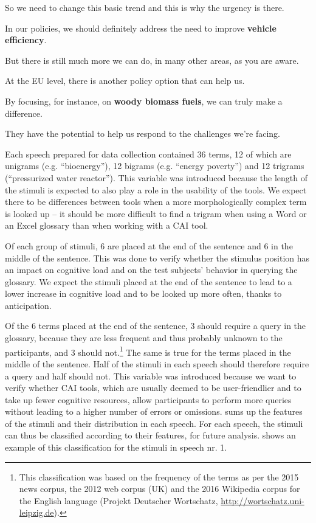 \documentclass[output=paper]{langsci/langscibook}
\begin{document}
\ea
So we need to change this basic trend and this is why the urgency is there.

In our policies, we should definitely address the need to improve \textbf{vehicle efficiency}.

But there is still much more we can do, in many other areas, as you are aware.

At the EU level, there is another policy option that can help us.

By focusing, for instance, on \textbf{woody biomass fuels}, we can truly make a difference.

They have the potential to help us respond to the challenges we’re facing.
\z

Each speech prepared for data collection contained 36 terms, 12 of which are unigrams (e.g. ``bioenergy''), 12 bigrams (e.g. ``energy poverty'') and 12 trigrams (``pressurized water reactor''). This variable was introduced because the length of the stimuli is expected to also play a role in the usability of the tools. We expect there to be differences between tools when a more morphologically complex term is looked up – it should be more difficult to find a trigram when using a Word or an Excel glossary than when working with a \textsc{CAI} tool. 

Of each group of stimuli, 6 are placed at the end of the sentence and 6 in the middle of the sentence. This was done to verify whether the stimulus position has an impact on cognitive load and on the test subjects’ behavior in querying the glossary. We expect the stimuli placed at the end of the sentence to lead to a lower increase in cognitive load and to be looked up more often, thanks to anticipation. 

Of the 6 terms placed at the end of the sentence, 3 should require a query in the glossary, because they are less frequent and thus probably unknown to the participants, and 3 should not.\footnote{This classification was based on the frequency of the terms as per the 2015 news corpus, the 2012 web corpus (UK) and the 2016 Wikipedia corpus for the English language (Projekt Deutscher Wortschatz, \url{http://wortschatz.uni-leipzig.de}).} The same is true for the terms placed in the middle of the sentence. Half of the stimuli in each speech should therefore require a query and half should not. This variable was introduced because we want to verify whether \textsc{CAI} tools, which are usually deemed to be user-friendlier and to take up fewer cognitive resources, allow participants to perform more queries without leading to a higher number of errors or omissions.  sums up the features of the stimuli and their distribution in each speech. For each speech, the stimuli can thus be classified according to their features, for future analysis.  shows an example of this classification for the stimuli in speech nr. 1.
\end{document}
